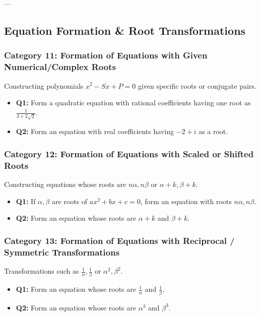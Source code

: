 \documentclass[10pt,a4paper]{article}
\begin{document}
---

\subsection{Equation Formation \& Root Transformations}

\subsubsection{Category 11: Formation of Equations with Given Numerical/Complex Roots}
Constructing polynomials $x^2 - Sx + P = 0$ given specific roots or conjugate pairs.
\begin{itemize}[leftmargin=*]
    \item \textbf{Q1:} Form a quadratic equation with rational coefficients having one root as $\frac{1}{3+2\sqrt{2}}$.
    \item \textbf{Q2:} Form an equation with real coefficients having $-2 + i$ as a root.
\end{itemize}

\subsubsection{Category 12: Formation of Equations with Scaled or Shifted Roots}
Constructing equations whose roots are $n\alpha, n\beta$ or $\alpha + k, \beta + k$.
\begin{itemize}[leftmargin=*]
    \item \textbf{Q1:} If $\alpha, \beta$ are roots of $ax^2 + bx + c = 0$, form an equation with roots $n\alpha, n\beta$.
    \item \textbf{Q2:} Form an equation whose roots are $\alpha + k$ and $\beta + k$.
\end{itemize}

\subsubsection{Category 13: Formation of Equations with Reciprocal / Symmetric Transformations}
Transformations such as $\frac{1}{\alpha}, \frac{1}{\beta}$ or $\alpha^2, \beta^2$.
\begin{itemize}[leftmargin=*]
    \item \textbf{Q1:} Form an equation whose roots are $\frac{1}{\alpha}$ and $\frac{1}{\beta}$.
    \item \textbf{Q2:} Form an equation whose roots are $\alpha^3$ and $\beta^3$.
\end{itemize}
\end{document}
